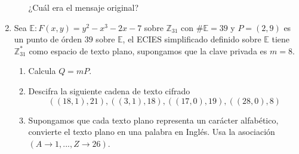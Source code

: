 \documentclass[letterpaper,11pt]{article}
\begin{document}
\begin{enumerate}
\begin{enumerate}
        ¿Cuál era el mensaje original?
    \end{enumerate}

    \item Sea $\mathbb{E} : F(x, y) = y^2 - x^3 - 2x - 7$ sobre 
    $\mathbb{Z}_{31}$ con $\# \mathbb{E} = 39$ y $P = (2, 9)$ es un punto de 
    órden $39$ sobre $\mathbb{E}$, el \textsc{ECIES} simplificado definido sobre 
    $\mathbb{E}$ tiene $\mathbb{Z}^{*}_{31}$ como espacio de texto plano, 
    supongamos que la clave privada es $m = 8$. 
    \begin{enumerate}
        \item Calcula $Q = mP$.
        \item Descifra la siguiente cadena de texto cifrado 
        \begin{equation*}
            ((18, 1), 21), ((3, 1), 18), ((17, 0), 19), ((28, 0), 8)
        \end{equation*}
        \item Supongamos que cada texto plano representa un carácter alfabético,
        convierte el texto plano en una palabra en Inglés. Usa la asociación 
        $(A \rightarrow 1, ..., Z \rightarrow 26)$.
    \end{enumerate}
\end{enumerate}
\end{document}
